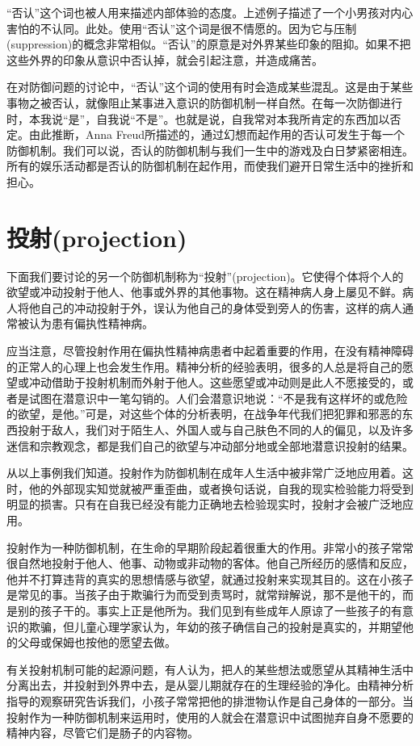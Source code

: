 \documentclass[UTF8,10pt,a4paper,openany]{book}
\begin{document}
“否认”这个词也被人用来描述内部体验的态度。上述例子描述了一个小男孩对内心害怕的不认同。此处。使用“否认”这个词是很不情愿的。因为它与压制(suppression)的概念非常相似。“否认”的原意是对外界某些印象的阻抑。如果不把这些外界的印象从意识中否认掉，就会引起注意，并造成痛苦。

在对防御问题的讨论中，“否认”这个词的使用有时会造成某些混乱。这是由于某些事物之被否认，就像阻止某事进入意识的防御机制一样自然。在每一次防御进行时，本我说“是”，自我说“不是”。也就是说，自我常对本我所肯定的东西加以否定。由此推断，Anna Freud所描述的，通过幻想而起作用的否认可发生于每一个防御机制。我们可以说，否认的防御机制与我们一生中的游戏及白日梦紧密相连。所有的娱乐活动都是否认的防御机制在起作用，而使我们避开日常生活中的挫折和担心。

\section*{投射(projection)}
下面我们要讨论的另一个防御机制称为“投射”(projection)。它使得个体将个人的欲望或冲动投射于他人、他事或外界的其他事物。这在精神病人身上屡见不鲜。病人将他自己的冲动投射于外，误认为他自己的身体受到旁人的伤害，这样的病人通常被认为患有偏执性精神病。

应当注意，尽管投射作用在偏执性精神病患者中起着重要的作用，在没有精神障碍的正常人的心理上也会发生作用。精神分析的经验表明，很多的人总是将自己的愿望或冲动借助于投射机制而外射于他人。这些愿望或冲动则是此人不愿接受的，或者是试图在潜意识中一笔勾销的。人们会潜意识地说：“不是我有这样坏的或危险的欲望，是他。”可是，对这些个体的分析表明，在战争年代我们把犯罪和邪恶的东西投射于敌人，我们对于陌生人、外国人或与自己肤色不同的人的偏见，以及许多迷信和宗教观念，都是我们自己的欲望与冲动部分地或全部地潜意识投射的结果。

从以上事例我们知道。投射作为防御机制在成年人生活中被非常广泛地应用着。这时，他的外部现实知觉就被严重歪曲，或者换句话说，自我的现实检验能力将受到明显的损害。只有在自我已经没有能力正确地去检验现实时，投射才会被广泛地应用。

投射作为一种防御机制，在生命的早期阶段起着很重大的作用。非常小的孩子常常很自然地投射于他人、他事、动物或非动物的客体。他自己所经历的感情和反应，他并不打算违背的真实的思想情感与欲望，就通过投射来实现其目的。这在小孩子是常见的事。当孩子由于欺骗行为而受到责骂时，就常辩解说，那不是他干的，而是别的孩子干的。事实上正是他所为。我们见到有些成年人原谅了一些孩子的有意识的欺骗，但儿童心理学家认为，年幼的孩子确信自己的投射是真实的，并期望他的父母或保姆也按他的愿望去做。

有关投射机制可能的起源问题，有人认为，把人的某些想法或愿望从其精神生活中分离出去，并投射到外界中去，是从婴儿期就存在的生理经验的净化。由精神分析指导的观察研究告诉我们，小孩子常常把他的排泄物认作是自己身体的一部分。当投射作为一种防御机制来运用时，使用的人就会在潜意识中试图抛弃自身不愿要的精神内容，尽管它们是肠子的内容物。
\end{document}
